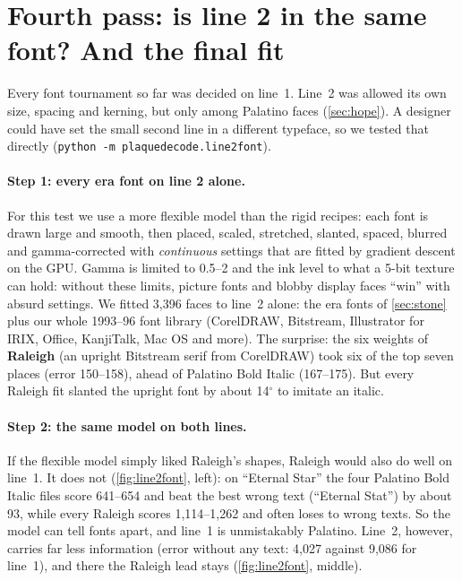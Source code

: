 \documentclass[10pt,a4paper]{article}
\newcommand{\q}[1]{``#1''}
\begin{document}
\section{Fourth pass: is line 2 in the same font? And the final fit}
\label{sec:line2font}
Every font tournament so far was decided on line~1. Line~2 was allowed its own size, spacing and kerning, but only
among Palatino faces (\cref{sec:hope}). A designer could have set the small second line in a different typeface, so we
tested that directly (\texttt{python -m plaquedecode.line2font}).

\paragraph{Step 1: every era font on line 2 alone.}
For this test we use a more flexible model than the rigid recipes: each font is drawn large and smooth, then placed,
scaled, stretched, slanted, spaced, blurred and gamma-corrected with \emph{continuous} settings that are fitted by
gradient descent on the GPU. Gamma is limited to 0.5--2 and the ink level to what a 5-bit texture can hold: without
these limits, picture fonts and blobby display faces \q{win} with absurd settings.
We fitted 3{,}396 faces to line~2 alone: the era fonts of \cref{sec:stone} plus our whole 1993--96 font library
(CorelDRAW, Bitstream, Illustrator for IRIX, Office, KanjiTalk, Mac OS and more). The surprise: the six weights of
\textbf{Raleigh} (an upright Bitstream serif from CorelDRAW) took six of the top seven places (error 150--158), ahead of
Palatino Bold Italic (167--175). But every Raleigh fit slanted the upright font by about 14$^\circ$ to imitate an italic.

\paragraph{Step 2: the same model on both lines.}
If the flexible model simply liked Raleigh's shapes, Raleigh would also do well on line~1. It does not
(\cref{fig:line2font}, left): on \q{Eternal Star} the four Palatino Bold Italic files score 641--654 and beat the best
wrong text (\q{Eternal Stat}) by about 93, while every Raleigh scores 1{,}114--1{,}262 and often loses to wrong texts.
So the model can tell fonts apart, and line~1 is unmistakably Palatino. Line~2, however, carries far less information
(error without any text: 4{,}027 against 9{,}086 for line~1), and there the Raleigh lead stays (\cref{fig:line2font},
middle).
\end{document}
